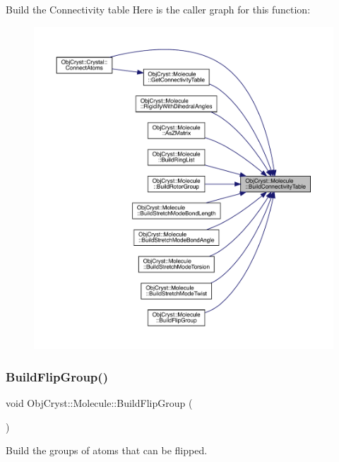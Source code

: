 Build the Connectivity table Here is the caller graph for this function\+:
\nopagebreak
\begin{figure}[H]
\begin{center}
\leavevmode
\includegraphics[width=350pt]{class_obj_cryst_1_1_molecule_a45ed440475011a0ceb933f56751c11da_icgraph}
\end{center}
\end{figure}
\mbox{\label{class_obj_cryst_1_1_molecule_aca2ed46d26209807d587722d131c6315}} 
\subsubsection{\texorpdfstring{BuildFlipGroup()}{BuildFlipGroup()}}
{\footnotesize\ttfamily void Obj\+Cryst\+::\+Molecule\+::\+Build\+Flip\+Group (\begin{DoxyParamCaption}{ }\end{DoxyParamCaption})}

Build the groups of atoms that can be flipped.

